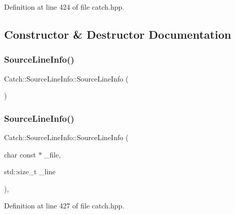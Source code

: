 Definition at line 424 of file catch.\+hpp.



\subsection{Constructor \& Destructor Documentation}
\mbox{\label{struct_catch_1_1_source_line_info_a2d80932bb4129b1606d1924a5c44be2f}} 
\subsubsection{SourceLineInfo()\hspace{0.1cm}{\footnotesize\ttfamily [1/4]}}
{\footnotesize\ttfamily Catch\+::\+Source\+Line\+Info\+::\+Source\+Line\+Info (\begin{DoxyParamCaption}{ }\end{DoxyParamCaption})\hspace{0.3cm}{\ttfamily [delete]}}

\mbox{\label{struct_catch_1_1_source_line_info_a48510b82a39a042ab370ed143dd30c10}} 
\subsubsection{SourceLineInfo()\hspace{0.1cm}{\footnotesize\ttfamily [2/4]}}
{\footnotesize\ttfamily Catch\+::\+Source\+Line\+Info\+::\+Source\+Line\+Info (\begin{DoxyParamCaption}\item[{char const $\ast$}]{\+\_\+file,  }\item[{std\+::size\+\_\+t}]{\+\_\+line }\end{DoxyParamCaption})\hspace{0.3cm}{\ttfamily [inline]}, {\ttfamily [noexcept]}}



Definition at line 427 of file catch.\+hpp.

\mbox{\label{struct_catch_1_1_source_line_info_a7c44c9986c33a9cf842b791374332d41}} 
